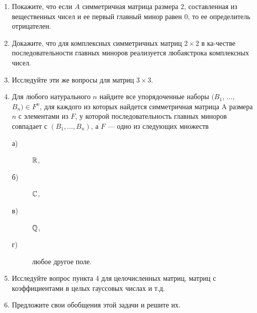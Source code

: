 \begin{enumerate}
\item Покажите, что если $A$ симметричная матрица размера $2$, составленная из вещественных чисел и ее первый главный минор равен $0$, то ее определитель отрицателен.
\item Докажите, что для комплексных симметричных матриц $2\times 2$ в ка-\linebreak честве последовательности главных миноров реализуется любая\linebreak строка комплексных чисел.
\item Исследуйте эти же вопросы для матриц $3\times 3$.
\item \label{targ} Для любого натурального $n$ найдите все упорядоченные наборы $(B_1$, $\ldots$, $B_n) \in F^n$, для каждого из которых найдется симметричная матрица A размера $n$ с элементами из $F$, у которой последовательность главных миноров совпадает с $(B_1, \dots , B_n )$, а $F$ — одно из следующих множеств
\begin{description}
\item[а) ] $\mathbb{R}$,
\item[б) ] $\mathbb{C}$,
\item[в) ] $\mathbb{Q}$,
\item[г) ] любое другое поле.
\end{description}
\item Исследуйте вопрос пункта 4 для целочисленных матриц, матриц с коэффициентами в целых гауссовых числах и т.д.
\item Предложите свои обобщения этой задачи и решите их.
\end{enumerate}





